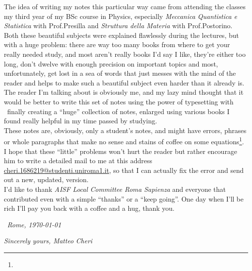 \documentclass[../qm.tex]{subfiles}
\begin{document}
The idea of writing my notes this particular way came from attending the classes my third year of my BSc course in Physics, especially \textit{Meccanica Quantistica e Statistica} with Prof.Presilla and \textit{Struttura della Materia} with Prof.Postorino. Both these beautiful subjects were explained flawlessly during the lectures, but with a huge problem: there are way too many books from where to get your really needed study, and most aren't really books I'd say I like, they're either too long, don't dwelve with enough precision on important topics and most, unfortunately, get lost in a sea of words that just messes with the mind of the reader and helps to make such a beautiful subject even harder than it already is. The reader I'm talking about is obviously me, and my lazy mind thought that it would be better to write this set of notes using the power of typesetting with \LaTeXe\ finally creating a ``huge'' collection of notes, enlarged using various books I found really helpful in my time passed by studying.\\
These notes are, obviously, only a student's notes, and might have errors, phrases or whole paragraphs that make no sense and stains of coffee on some equations\footnote{\scalebox{0.1}{I absolutely don't, and won't, take responsibility for any explicitly and voluntarily malicious error present in these notes}}. I hope that these ``little'' problems won't hurt the reader but rather encourage him to write a detailed mail to me at this address \href{mailto:cheri.1686219@studenti.uniroma1.it}{cheri.1686219@studenti.uniroma1.it}, so that I can actually fix the error and send out a new, updated, version.\\
I'd like to thank \textit{AISF Local Committee Roma Sapienza} and everyone that contributed even with a simple ``thanks'' or a ``keep going''. One day when I'll be rich I'll pay you back with a coffee and a hug, thank you.
\vskip 0.5cm
\begin{raggedleft}
\ \hfill\textit{Rome, \today}
\end{raggedleft}
\vskip 1cm
\begin{center}
\textit{Sincerely yours, Matteo Cheri}
\end{center}
\vfill
\end{document}
